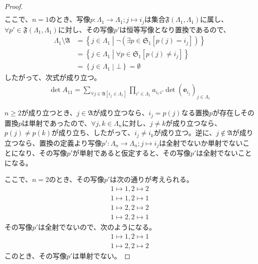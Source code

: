 \documentclass[dvipdfmx]{jsarticle}
\begin{document}
\begin{proof}
\begin{align*}
\end{align*}
ここで、$n = 1$のとき、写像$p:\varLambda_{1} \rightarrow \varLambda_{1};j \mapsto i_{j}$は集合$\mathfrak{F}\left( \varLambda_{1},\varLambda_{1} \right)$に属し、$\forall p'\in \mathfrak{F}\left( \varLambda_{1},\varLambda_{1} \right)$に対し、その写像$p'$は恒等写像となり置換であるので、
\begin{align*}
\varLambda_{1} \setminus \mathfrak{A} &= \left\{ j \in \varLambda_{1} \middle| \neg\left( \exists p \in \mathfrak{S}_{1}\left[ p(j) = i_{j} \right] \right) \right\}\\
&= \left\{ j \in \varLambda_{1} \middle| \forall p \in \mathfrak{S}_{1}\left[ p(j) \neq i_{j} \right] \right\}\\
&= \left\{ j \in \varLambda_{1} \middle| \bot \right\} = \emptyset
\end{align*}
したがって、次式が成り立つ。
\begin{align*}
\det A_{11} = \sum_{\forall j \in \mathfrak{A}\left[ i_{j} \in \varLambda_{1} \right]} {\prod_{i' \in \varLambda_{1}} a_{i_{i'}i'}\det\left( \mathbf{e}_{i_{j}} \right)_{j \in \varLambda_{1}}}
\end{align*}\par
$n \geq 2$が成り立つとき、$j \in \mathfrak{A}$が成り立つなら、$i_{j} = p(j)$なる置換$p$が存在しその置換$p$は単射であったので、$\forall j,k \in \varLambda_{n}$に対し、$j \neq k$が成り立つなら、$p(j) \neq p(k)$が成り立ち、したがって、$i_{j} \neq i_{k}$が成り立つ。逆に、$j \notin \mathfrak{A}$が成り立つなら、置換の定義より写像$p':\varLambda_{n} \rightarrow \varLambda_{n};j \mapsto i_{j}$は全射でないか単射でないことになり、その写像$p'$が単射であると仮定すると、その写像$p'$は全射でないことになる。\par
ここで、$n = 2$のとき、その写像$p'$は次の通りが考えられる。
\begin{align*}
1 \mapsto 1,2 \mapsto 2 \\
1 \mapsto 1,2 \mapsto 1 \\
1 \mapsto 2,2 \mapsto 2 \\
1 \mapsto 2,2 \mapsto 1
\end{align*}
その写像$p'$は全射でないので、次のようになる。
\begin{align*}
1 \mapsto 1,2 \mapsto 1 \\
1 \mapsto 2,2 \mapsto 2
\end{align*}
このとき、その写像$p'$は単射でない。\par

\end{proof}
\end{document}
